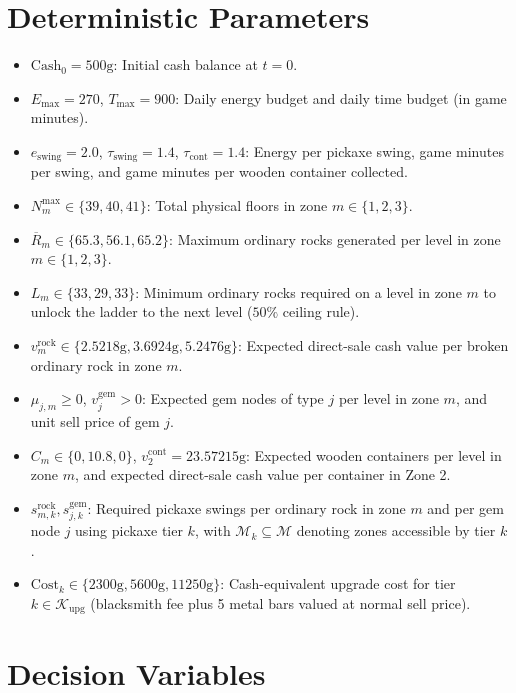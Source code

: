 \documentclass[11pt,a4paper]{article}
\begin{document}
\section{Deterministic Parameters}
\begin{itemize}
    \item $\text{Cash}_0 = 500\text{g}$: Initial cash balance at $t = 0$.
    \item $E_{\max} = 270$, $T_{\max} = 900$: Daily energy budget and daily time budget (in game minutes).
    \item $e_{\text{swing}} = 2.0$, $\tau_{\text{swing}} = 1.4$, $\tau_{\text{cont}} = 1.4$: Energy per pickaxe swing, game minutes per swing, and game minutes per wooden container collected.
    \item $N_m^{\max} \in \{39, 40, 41\}$: Total physical floors in zone $m \in \{1, 2, 3\}$.
    \item $\overline{R}_m \in \{65.3, 56.1, 65.2\}$: Maximum ordinary rocks generated per level in zone $m \in \{1, 2, 3\}$.
    \item $L_m \in \{33, 29, 33\}$: Minimum ordinary rocks required on a level in zone $m$ to unlock the ladder to the next level ($50\%$ ceiling rule).
    \item $v_m^{\text{rock}} \in \{2.5218\text{g}, 3.6924\text{g}, 5.2476\text{g}\}$: Expected direct-sale cash value per broken ordinary rock in zone $m$.
    \item $\mu_{j,m} \ge 0$, $v_j^{\text{gem}} > 0$: Expected gem nodes of type $j$ per level in zone $m$, and unit sell price of gem $j$.
    \item $C_m \in \{0, 10.8, 0\}$, $v_2^{\text{cont}} = 23.57215\text{g}$: Expected wooden containers per level in zone $m$, and expected direct-sale cash value per container in Zone 2.
    \item $s_{m,k}^{\text{rock}}, s_{j,k}^{\text{gem}}$: Required pickaxe swings per ordinary rock in zone $m$ and per gem node $j$ using pickaxe tier $k$, with $\mathcal{M}_k \subseteq \mathcal{M}$ denoting zones accessible by tier $k$.
    \item $\text{Cost}_k \in \{2300\text{g}, 5600\text{g}, 11250\text{g}\}$: Cash-equivalent upgrade cost for tier $k \in \mathcal{K}_{\text{upg}}$ (blacksmith fee plus 5 metal bars valued at normal sell price).
\end{itemize}

\section{Decision Variables}
\end{document}
